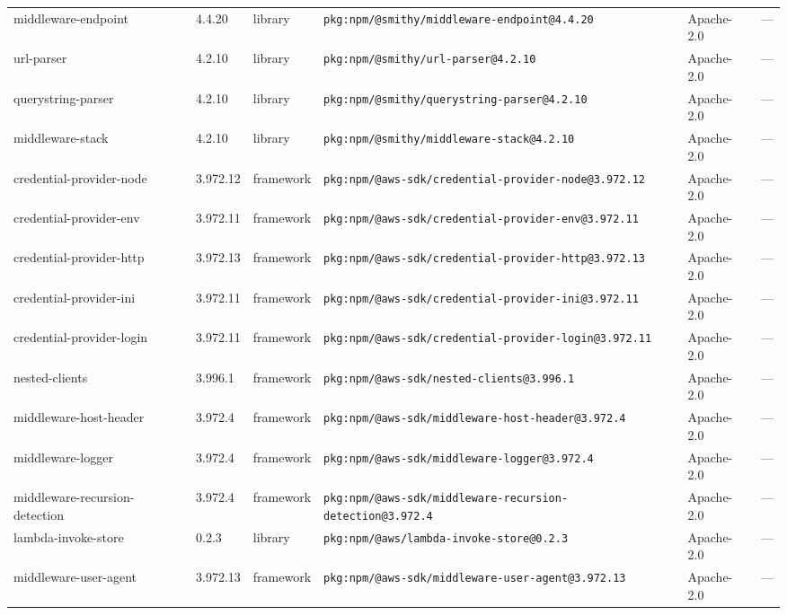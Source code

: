 \documentclass[11pt,a4paper]{article}
\begin{document}
\begin{longtable}{|p{4cm}|p{2cm}|p{1.6cm}|p{5cm}|p{1.5cm}|p{3.5cm}|}
\raggedright middleware-endpoint & 4.4.20 & library & \small\texttt{pkg:npm/@smithy/middleware-endpoint@4.4.20} & Apache-2.0 & \small — \\
\raggedright url-parser & 4.2.10 & library & \small\texttt{pkg:npm/@smithy/url-parser@4.2.10} & Apache-2.0 & \small — \\
\raggedright querystring-parser & 4.2.10 & library & \small\texttt{pkg:npm/@smithy/querystring-parser@4.2.10} & Apache-2.0 & \small — \\
\raggedright middleware-stack & 4.2.10 & library & \small\texttt{pkg:npm/@smithy/middleware-stack@4.2.10} & Apache-2.0 & \small — \\
\raggedright credential-provider-node & 3.972.12 & framework & \small\texttt{pkg:npm/@aws-sdk/credential-provider-node@3.972.12} & Apache-2.0 & \small — \\
\raggedright credential-provider-env & 3.972.11 & framework & \small\texttt{pkg:npm/@aws-sdk/credential-provider-env@3.972.11} & Apache-2.0 & \small — \\
\raggedright credential-provider-http & 3.972.13 & framework & \small\texttt{pkg:npm/@aws-sdk/credential-provider-http@3.972.13} & Apache-2.0 & \small — \\
\raggedright credential-provider-ini & 3.972.11 & framework & \small\texttt{pkg:npm/@aws-sdk/credential-provider-ini@3.972.11} & Apache-2.0 & \small — \\
\raggedright credential-provider-login & 3.972.11 & framework & \small\texttt{pkg:npm/@aws-sdk/credential-provider-login@3.972.11} & Apache-2.0 & \small — \\
\raggedright nested-clients & 3.996.1 & framework & \small\texttt{pkg:npm/@aws-sdk/nested-clients@3.996.1} & Apache-2.0 & \small — \\
\raggedright middleware-host-header & 3.972.4 & framework & \small\texttt{pkg:npm/@aws-sdk/middleware-host-header@3.972.4} & Apache-2.0 & \small — \\
\raggedright middleware-logger & 3.972.4 & framework & \small\texttt{pkg:npm/@aws-sdk/middleware-logger@3.972.4} & Apache-2.0 & \small — \\
\raggedright middleware-recursion-detection & 3.972.4 & framework & \small\texttt{pkg:npm/@aws-sdk/middleware-recursion-detection@3.972.4} & Apache-2.0 & \small — \\
\raggedright lambda-invoke-store & 0.2.3 & library & \small\texttt{pkg:npm/@aws/lambda-invoke-store@0.2.3} & Apache-2.0 & \small — \\
\raggedright middleware-user-agent & 3.972.13 & framework & \small\texttt{pkg:npm/@aws-sdk/middleware-user-agent@3.972.13} & Apache-2.0 & \small — \\

\end{longtable}
\end{document}
